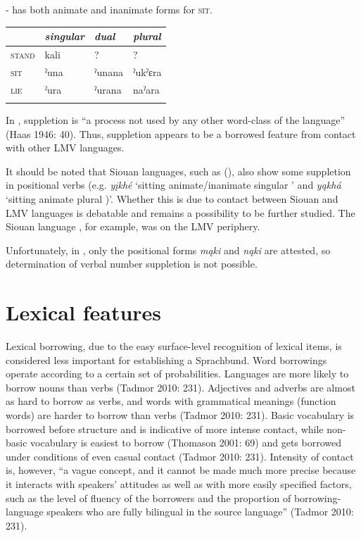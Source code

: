 \documentclass[output=paper]{LSP/langsci}
\begin{document}
- has both animate and inanimate forms for \textsc{sit}.

\ea
{\hspace{1em}}\newline
\settowidth{}
\begin{tabular}{llll}
\hhline{====}& \emph{singular} & \emph{dual} & \emph{plural}
\\ \hline \textsc{stand} & kali\footnotemark & ? & ?
\\ \textsc{sit} & ˀuna & ˀunana & ˀukˀɛra 
\\ \textsc{lie} & ˀura & ˀurana & naˀara 
\\ \hhline{====}
\end{tabular} 
\z

In , suppletion is “a process not used by any other word-class of the language” (Haas 1946: 40). Thus,  suppletion appears to be a borrowed feature from contact with other LMV languages.

	It should be noted that  Siouan languages, such as  (), also show some suppletion in positional verbs (e.g.  \emph{yįkhé} `sitting animate/inanimate singular ' and \emph{yąkhá} `sitting animate plural )'. Whether this is due to contact between  Siouan and LMV languages is debatable and remains a possibility to be further studied. The  Siouan language , for example, was on the LMV periphery.

Unfortunately, in , only the positional forms \emph{mąki} and \emph{nąki} are attested, so determination of verbal number suppletion is not possible.

\section{Lexical features}

	Lexical borrowing, due to the easy surface-level recognition of lexical items, is considered less important for establishing a Sprachbund. Word borrowings operate according to a certain set of probabilities. Languages are more likely to borrow nouns than verbs (Tadmor 2010: 231). Adjectives and adverbs are almost as hard to borrow as verbs, and words with grammatical meanings (function words) are harder to borrow than verbs (Tadmor 2010: 231). Basic vocabulary is borrowed before structure and is indicative of more intense contact, while non-basic vocabulary is easiest to borrow (Thomason 2001: 69) and gets borrowed under conditions of even casual contact (Tadmor 2010: 231). Intensity of contact is, however, “a vague concept, and it cannot be made much more precise because it interacts with speakers’ attitudes as well as with more easily specified factors, such as the level of fluency of the borrowers and the proportion of borrowing-language speakers who are fully bilingual in the source language” (Tadmor 2010: 231). 
\end{document}
